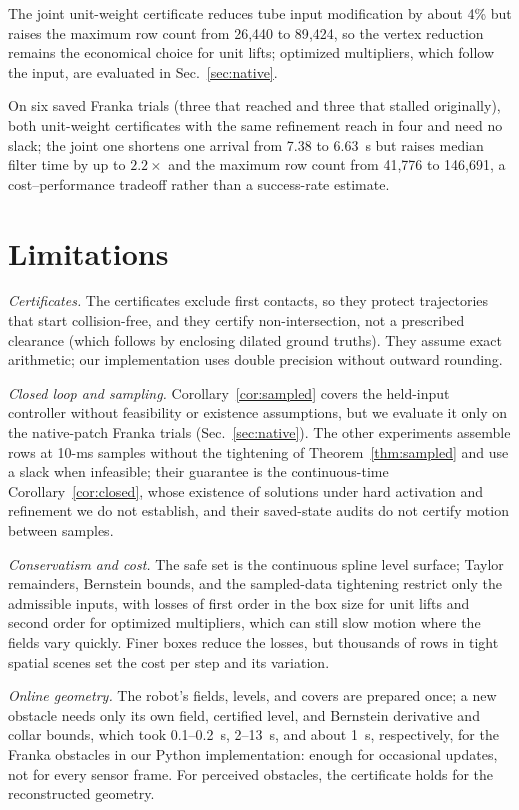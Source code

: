 \documentclass[journal]{IEEEtran}
\theoremstyle{definition}
\begin{document}
The joint unit-weight certificate reduces tube input modification by about 4\% but raises the
maximum row count from 26{,}440 to 89{,}424, so the vertex reduction remains the economical choice
for unit lifts; optimized multipliers, which follow the input, are evaluated in Sec.~\ref{sec:native}.

On six saved Franka trials (three that reached and three that stalled originally), both unit-weight
certificates with the same refinement reach in four and need no slack; the joint one shortens one
arrival from 7.38 to 6.63~s but raises median filter time by up to $2.2\times$ and the maximum row
count from 41{,}776 to 146{,}691, a cost--performance tradeoff rather than a success-rate estimate.

\section{Limitations}\label{sec:limits}
\emph{Certificates.} The certificates exclude first contacts, so they protect trajectories that
start collision-free, and they certify non-intersection, not a prescribed clearance (which follows
by enclosing dilated ground truths). They assume exact arithmetic; our implementation uses double
precision without outward rounding.

\emph{Closed loop and sampling.} Corollary~\ref{cor:sampled} covers the held-input controller
without feasibility or existence assumptions, but we evaluate it only on the native-patch Franka
trials (Sec.~\ref{sec:native}). The other experiments assemble rows at 10-ms samples without the
tightening of Theorem~\ref{thm:sampled} and use a slack when infeasible; their guarantee is the
continuous-time Corollary~\ref{cor:closed}, whose existence of solutions under hard activation and
refinement we do not establish, and their saved-state audits do not certify motion between samples.

\emph{Conservatism and cost.} The safe set is the continuous spline level surface; Taylor
remainders, Bernstein bounds, and the sampled-data tightening restrict only the admissible inputs,
with losses of first order in the box size for unit lifts and second order for optimized
multipliers, which can still slow motion where the fields vary quickly. Finer boxes reduce the losses,
but thousands of rows in tight spatial scenes set the cost per step and its variation.

\emph{Online geometry.} The robot's fields, levels, and covers are prepared once; a new obstacle needs
only its own field, certified level, and Bernstein derivative and collar bounds, which took
0.1--0.2~s, 2--13~s, and about 1~s, respectively, for the Franka obstacles in our Python
implementation: enough for occasional updates, not for every sensor frame. For perceived obstacles, the certificate holds for the reconstructed geometry.
\end{document}
